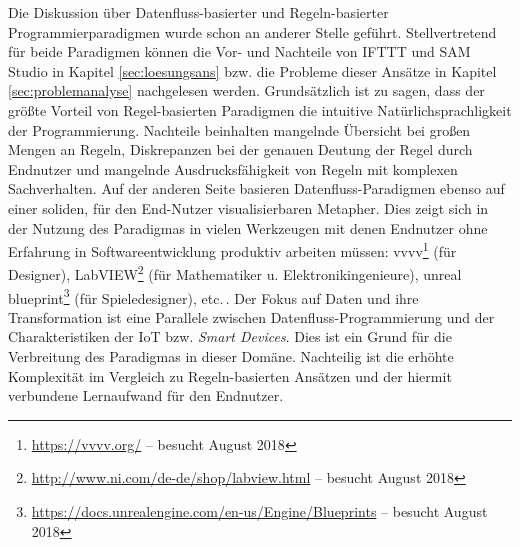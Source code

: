 Die Diskussion über Datenfluss-basierter und Regeln-basierter Programmierparadigmen wurde schon an anderer Stelle geführt. Stellvertretend für beide Paradigmen können die Vor- und Nachteile von IFTTT und SAM Studio in Kapitel \ref{sec:loesungsans} bzw. die Probleme dieser Ansätze in Kapitel \ref{sec:problemanalyse} nachgelesen werden. Grundsätzlich ist zu sagen, dass der größte Vorteil von Regel-basierten Paradigmen die intuitive Natürlichsprachligkeit der Programmierung. Nachteile beinhalten mangelnde Übersicht bei großen Mengen an Regeln, Diskrepanzen bei der genauen Deutung der Regel durch Endnutzer und mangelnde Ausdrucksfähigkeit von Regeln mit komplexen Sachverhalten. Auf der anderen Seite basieren Datenfluss-Paradigmen ebenso auf einer soliden, für den End-Nutzer visualisierbaren Metapher. Dies zeigt sich in der Nutzung des Paradigmas in vielen Werkzeugen mit denen Endnutzer ohne Erfahrung in Softwareentwicklung produktiv arbeiten müssen: vvvv\footnote{\url{https://vvvv.org/} -- besucht August 2018} (für Designer), LabVIEW\footnote{\url{http://www.ni.com/de-de/shop/labview.html} -- besucht August 2018} (für Mathematiker u. Elektronikingenieure), unreal blueprint\footnote{\url{https://docs.unrealengine.com/en-us/Engine/Blueprints} -- besucht August 2018} (für Spieledesigner), etc.\,. Der Fokus auf Daten und ihre Transformation ist eine Parallele zwischen Datenfluss-Programmierung und der Charakteristiken der \ac{IoT} bzw. \textit{Smart Devices}. Dies ist ein Grund für die Verbreitung des Paradigmas in dieser Domäne. Nachteilig ist die erhöhte Komplexität im Vergleich zu Regeln-basierten Ansätzen und der hiermit verbundene Lernaufwand für den Endnutzer.


